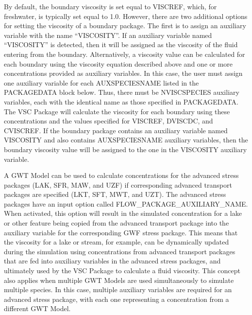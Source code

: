 By default, the boundary viscosity is set equal to VISCREF, which, for freshwater, is typically set equal to 1.0. However, there are two additional options for setting the viscosity of a boundary package.  The first is to assign an auxiliary variable with the name ``VISCOSITY''.  If an auxiliary variable named ``VISCOSITY'' is detected, then it will be assigned as the viscosity of the fluid entering from the boundary.  Alternatively, a viscosity value can be calculated for each boundary using the viscosity equation described above and one or more concentrations provided as auxiliary variables.  In this case, the user must assign one auxiliary variable for each AUXSPECIESNAME listed in the PACKAGEDATA block below.  Thus, there must be NVISCSPECIES auxiliary variables, each with the identical name as those specified in PACKAGEDATA.  The VSC Package will calculate the viscosity for each boundary using these concentrations and the values specified for VISCREF, DVISCDC, and CVISCREF.  If the boundary package contains an auxiliary variable named VISCOSITY and also contains AUXSPECIESNAME auxiliary variables, then the boundary viscosity value will be assigned to the one in the VISCOSITY auxiliary variable.

A GWT Model can be used to calculate concentrations for the advanced stress packages (LAK, SFR, MAW, and UZF) if corresponding advanced transport packages are specified (LKT, SFT, MWT, and UZT).  The advanced stress packages have an input option called FLOW\_PACKAGE\_AUXILIARY\_NAME.  When activated, this option will result in the simulated concentration for a lake or other feature being copied from the advanced transport package into the auxiliary variable for the corresponding GWF stress package.  This means that the viscosity for a lake or stream, for example, can be dynamically updated during the simulation using concentrations from advanced transport packages that are fed into auxiliary variables in the advanced stress packages, and ultimately used by the VSC Package to calculate a fluid viscosity.  This concept also applies when multiple GWT Models are used simultaneously to simulate multiple species.  In this case, multiple auxiliary variables are required for an advanced stress package, with each one representing a concentration from a different GWT Model.  


